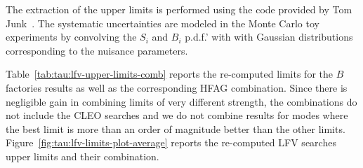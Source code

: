 The extraction of the upper limits is performed using the code provided by
Tom Junk~\cite{junk:2007:cdfnote}. The systematic uncertainties are modeled
in the Monte Carlo toy experiments by convolving the $S_i$ and $B_i$
p.d.f.' with with Gaussian distributions corresponding to the nuisance
parameters. 

Table~\ref{tab:tau:lfv-upper-limits-comb} reports the re-computed limits
for the $B$ factories results as well as the corresponding HFAG
combination. Since there is negligible gain in combining limits of very
different strength, the combinations do not include the CLEO searches and we do not
combine results for modes where the best limit is more than an order of
magnitude better than the other limits.
Figure~\ref{fig:tau:lfv-limits-plot-average} reports the re-computed \mtau
LFV searches upper limits and their combination.



